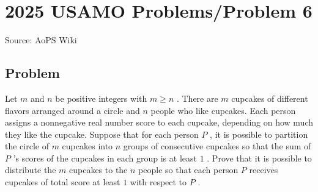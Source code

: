 \documentclass[12pt]{article}
\begin{document}
\section*{{2025 USAMO Problems/Problem 6}}
Source: AoPS Wiki

\subsection*{Problem}
Let $m$ and $n$ be positive integers with $m\geq n$ . There are $m$ cupcakes of different flavors arranged around a circle and $n$ people who like cupcakes. Each person assigns a nonnegative real number score to each cupcake, depending on how much they like the cupcake. Suppose that for each person $P$ , it is possible to partition the circle of $m$ cupcakes into $n$ groups of consecutive cupcakes so that the sum of $P$ 's scores of the cupcakes in each group is at least $1$ . Prove that it is possible to distribute the $m$ cupcakes to the $n$ people so that each person $P$ receives cupcakes of total score at least $1$ with respect to $P$ .
\end{document}
